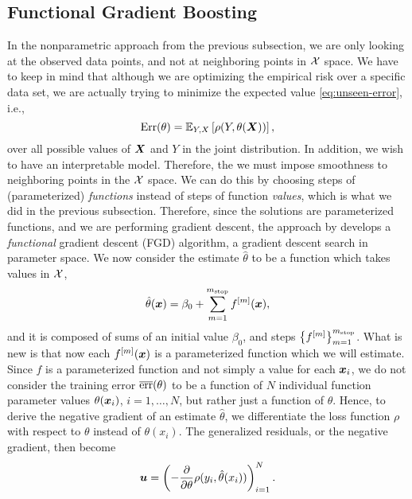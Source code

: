 \subsection{Functional Gradient Boosting}\label{sec:FGD}
In the nonparametric approach from the previous subsection, we are only looking at the observed data points, and not at neighboring points in $\mathcal{X}$ space.
We have to keep in mind that although we are optimizing the empirical risk over a specific data set, we are actually trying to minimize the expected value \eqref{eq:unseen-error}, i.e.,
\begin{equation*}
    \text{Err}(\theta)=\mathbb{E}_{Y,X}\left[\rho(Y,\theta(\bm{X}))\right],
\end{equation*}
over all possible values of $\bm{X}$ and $Y$ in the joint distribution.
In addition, we wish to have an interpretable model.
Therefore, the we must impose smoothness to neighboring points in the $\mathcal{X}$ space.
We can do this by choosing steps of (parameterized) \textit{functions} instead of steps of function \textit{values}, which is what we did in the previous subsection.
Therefore, since the solutions are parameterized functions, and we are performing gradient descent, the approach by \citet{friedman2001} develops a \textit{functional} gradient descent (FGD) algorithm, a gradient descent search in parameter space.
We now consider the estimate $\hat{\theta}$ to be a function which takes values in $\mathcal{X}$,
\begin{equation}\label{eq:fgd-theta}
    \hat{\theta}(\bm{x})=\beta_0+\sum_{m=1}^{m_{\text{stop}}}f^{[m]}(\bm{x}),
\end{equation}
and it is composed of sums of an initial value $\beta_0$, and steps $\left\{f^{[m]}\right\}_{m=1}^{m_{\text{stop}}}$.
What is new is that now each $f^{[m]}(\bm{x})$ is a parameterized function which we will estimate.
Since $f$ is a parameterized function and not simply a value for each $\bm{x}_i$, we do not consider the training error $\overline{\text{err}}(\theta)$ to be a function of $N$ individual function parameter values $\theta(\bm{x}_i)$, $i=1,\ldots,N$, but rather just a function of $\theta$.
Hence, to derive the negative gradient of an estimate $\hat{\theta}$, we differentiate the loss function $\rho$ with respect to $\theta$ instead of $\theta(x_i)$.
The generalized residuals, or the negative gradient, then become
\begin{equation*}
    \bm{u}=\left(-\frac{\partial}{\partial \theta}\rho(y_i, \hat{\theta}(x_i))\right)_{i=1}^N.
\end{equation*}

